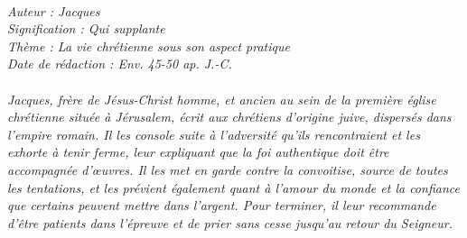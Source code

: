 \BFont
\noindent\hrulefill
{\footnotesize
\textit{
\bigskip
{\centering{}
\\Auteur : Jacques
\\Signification : Qui supplante
\\Thème : La vie chrétienne sous son aspect pratique
\\Date de rédaction : Env. 45-50 ap. J.-C.\\}
}
\textit{
\\Jacques, frère de Jésus-Christ homme, et ancien au sein de la première église chrétienne située à Jérusalem, écrit aux chrétiens d'origine juive, dispersés dans l'empire romain. Il les console suite à l'adversité qu'ils rencontraient et les exhorte à tenir ferme, leur expliquant que la foi authentique doit être accompagnée d'œuvres. Il les met en garde contre la convoitise, source de toutes les tentations, et les prévient également quant à l'amour du monde et la confiance que certains peuvent mettre dans l'argent. Pour terminer, il leur recommande d'être patients dans l'épreuve et de prier sans cesse jusqu'au retour du Seigneur.\bigskip
}
}
\par\nobreak\noindent\hrulefill
